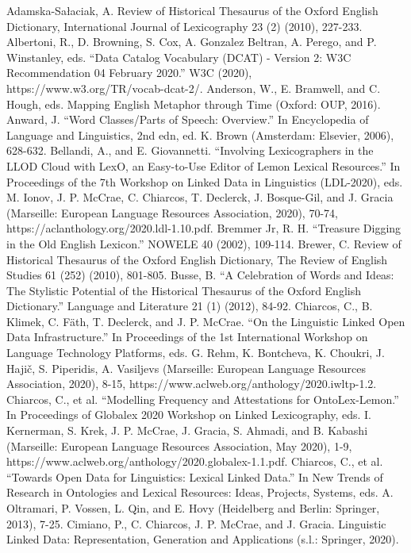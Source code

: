 Adamska-Sałaciak, A. Review of Historical Thesaurus of the Oxford English Dictionary, International Journal of Lexicography 23 (2) (2010), 227-233.
Albertoni, R., D. Browning, S. Cox, A. Gonzalez Beltran, A. Perego, and P. Winstanley, eds. “Data Catalog Vocabulary (DCAT) - Version 2: W3C Recommendation 04 February 2020.” W3C (2020), https://www.w3.org/TR/vocab-dcat-2/.
Anderson, W., E. Bramwell, and C. Hough, eds. Mapping English Metaphor through Time (Oxford: OUP, 2016).
Anward, J. “Word Classes/Parts of Speech: Overview.” In Encyclopedia of Language and Linguistics, 2nd edn, ed. K. Brown (Amsterdam: Elsevier, 2006), 628-632.
Bellandi, A., and E. Giovannetti. “Involving Lexicographers in the LLOD Cloud with LexO, an Easy-to-Use Editor of Lemon Lexical Resources.” In Proceedings of the 7th Workshop on Linked Data in Linguistics (LDL-2020), eds. M. Ionov, J. P. McCrae, C. Chiarcos, T. Declerck, J. Bosque-Gil, and J. Gracia (Marseille: European Language Resources Association, 2020), 70-74, https://aclanthology.org/2020.ldl-1.10.pdf.
Bremmer Jr, R. H. “Treasure Digging in the Old English Lexicon.” NOWELE 40 (2002), 109-114.
Brewer, C. Review of Historical Thesaurus of the Oxford English Dictionary, The Review of English Studies 61 (252) (2010), 801-805.
Busse, B. “A Celebration of Words and Ideas: The Stylistic Potential of the Historical Thesaurus of the Oxford English Dictionary.” Language and Literature 21 (1) (2012), 84-92.
Chiarcos, C., B. Klimek, C. Fäth, T. Declerck, and J. P. McCrae. “On the Linguistic Linked Open Data Infrastructure.” In Proceedings of the 1st International Workshop on Language Technology Platforms, eds. G. Rehm, K. Bontcheva, K. Choukri, J. Hajič, S. Piperidis, A. Vasiljevs (Marseille: European Language Resources Association, 2020), 8-15, https://www.aclweb.org/anthology/2020.iwltp-1.2.
Chiarcos, C., et al. “Modelling Frequency and Attestations for OntoLex-Lemon.” In Proceedings of Globalex 2020 Workshop on Linked Lexicography, eds. I. Kernerman, S. Krek, J. P. McCrae, J. Gracia, S. Ahmadi, and B. Kabashi (Marseille: European Language Resources Association, May 2020), 1-9, https://www.aclweb.org/anthology/2020.globalex-1.1.pdf.
Chiarcos, C., et al. “Towards Open Data for Linguistics: Lexical Linked Data.” In New Trends of Research in Ontologies and Lexical Resources: Ideas, Projects, Systems, eds. A. Oltramari, P. Vossen, L. Qin, and E. Hovy (Heidelberg and Berlin: Springer, 2013), 7-25.
Cimiano, P., C. Chiarcos, J. P. McCrae, and J. Gracia. Linguistic Linked Data: Representation, Generation and Applications (s.l.: Springer, 2020).
